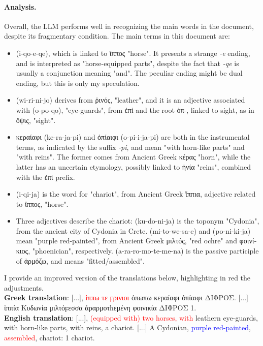 \paragraph{Analysis.}
Overall, the LLM performs well in recognizing the main words in the document, despite its fragmentary condition.
The main terms in this document are:
\begin{itemize}
  \item \textlinb{\Bi\Bqo\Be\Bqe} (i-qo-e-qe), which is linked to \textgreek{ἵππος} "horse". 
  It presents a strange \textit{-e} ending, and is interpreted as "horse-equipped parts", despite the fact that \textit{-qe} is usually a conjunction meaning "and".
  The peculiar ending might be dual ending, but this is only my speculation.
  \item \textlinb{\Bwi\Bri\Bni\Bo} (wi-ri-ni-jo) derives from \textgreek{ῥινός}, "leather", and it is an adjective associated with \textlinb{\Bo\Bpo\Bqo} (o-po-qo), "eye-guards", from \textgreek{ἐπί} and the root \textgreek{ὀπ-}, linked to sight, as in \textgreek{ὄψις}, "sight".
  \item \textgreek{κεραίαφι} (ke-ra-ja-pi) and \textgreek{ὀπίαιφι} (o-pi-i-ja-pi) are both in the instrumental terms, as indicated by the suffix \textit{-pi}, and mean "with horn-like parts" and "with reins".
  The former comes from Ancient Greek \textgreek{κέρας} "horn", while the latter has an uncertain etymology, possibly linked to \textgreek{ἡνία} "reins", combined with the \textgreek{ἐπί} prefix.
  \item \textlinb{\Bi\Bqi\Ba} (i-qi-ja) is the word for "chariot", from Ancient Greek \textgreek{ἵππια}, adjective related to \textgreek{ἵππος}, "horse".
  \item Three adjectives describe the chariot: \textlinb{\Bku\Bdo\Bni\Ba} (ku-do-ni-ja) is the toponym "Cydonia", from the ancient city of Cydonia in Crete.
  \textlinb{\Bmi\Bto\Bwe\Bsa\Be} (mi-to-we-sa-e) and \textlinb{\Bpo\Bni\Bki\Bja} (po-ni-ki-ja) mean "purple red-painted", from Ancient Greek \textgreek{μιλτός}, "red ochre" and \textgreek{φοινίκιος}, "phoenician", respectively. 
  \textlinb{\Ba\Bra\Bro\Bmo\Bte\Bme\Bna} (a-ra-ro-mo-te-me-na) is the passive participle of \textgreek{ἀρμόζω}, and means "fitted/assembled".
\end{itemize}
I provide an improved version of the translations below, highlighting in red the adjustments. \\
\textbf{Greek translation}: \textgreek{[...],} \textcolor{red}{\textgreek{ἱππω τε ϝρινιοι}} \textgreek{ὀπωπω κεραίαφι ὀπίαιφι ΔΙΦΡΟΣ. [...] ἱππία Κυδωνία μιλτόϝεσσα ἀραρμοτhεμένη φοινικία ΔΙΦΡΟΣ 1.} \\
\textbf{English translation}: [...], \textcolor{red}{(equipped with) two horses, with} leathern eye-guards, with horn-like parts, with reins, a chariot. [...] A Cydonian, \textcolor{blue}{purple red-painted}, \textcolor{red}{assembled}, chariot: 1 chariot.

